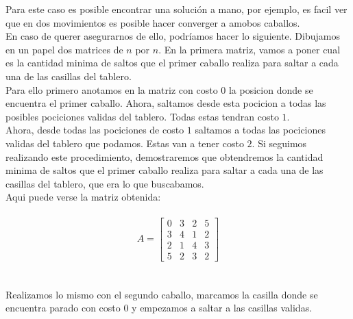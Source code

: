 Para este caso es posible encontrar una soluci\'on a mano, por ejemplo, es facil ver que en dos movimientos es posible hacer converger a amobos caballos.
\\
En caso de querer asegurarnos de ello, podr\'iamos hacer lo siguiente. Dibujamos en un papel dos matrices de $n$ por $n$. En la primera matriz, vamos a poner cual es la cantidad minima de saltos que el primer caballo realiza para saltar a cada una de las casillas del tablero. 
\\
Para ello primero anotamos en la matriz con costo $0$ la posicion donde se encuentra el primer caballo. Ahora, saltamos desde esta pocicion a todas las posibles pociciones validas del tablero. Todas estas tendran costo $1$.
\\
Ahora, desde todas las pociciones de costo $1$ saltamos a todas las pociciones validas del tablero que podamos. Estas van a tener costo $2$. Si seguimos realizando este procedimiento, demostraremos que obtendremos la cantidad minima de saltos que el primer caballo realiza para saltar a cada una de las casillas del tablero, que era lo que buscabamos.
\\
Aqui puede verse la matriz obtenida:
\\
\\
$$A = \begin{bmatrix}
      0 & 3 & 2 & 5   \\[0.3em]
      3 & 4 & 1 & 2   \\[0.3em]
      2 & 1 & 4 & 3   \\[0.3em]
      5 & 2 & 3 & 2 
\end{bmatrix}$$
\\
\\
Realizamos lo mismo con el segundo caballo, marcamos la casilla donde se encuentra parado con costo $0$ y empezamos a saltar a las casillas validas.

